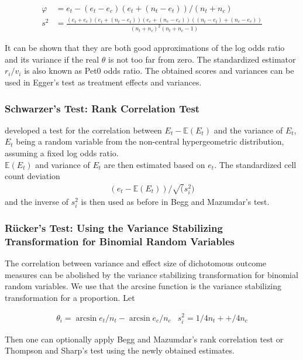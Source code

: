 \documentclass[11pt,a4paper,twoside]{book}\usepackage[]{graphicx}\usepackage[]{color}
\begin{document}
\begin{align}
\varphi &= e_t - (e_t - e_c)(e_t + (n_t - e_t))/(n_t + n_c) \label{harbord.score} \\
s^2 &= \frac{(e_t + e_c)(e_t + (n_t - e_t))(e_c + (n_c - e_c))((n_t - e_t) + (n_c - e_c))}{(n_t + n_c)^2(n_t + n_c - 1)} \label{harbord.variance}
\end{align}

It can be shown that they are both good approximations of the log odds ratio and its variance if the real $\theta$ is not too far from zero. The standardized estimator $r_i/v_i$ is also known as Pet0 odds ratio. The obtained scores and variances can be used in Egger's test as treatment effects and variances.


\subsubsection{Schwarzer's Test: Rank Correlation Test} \label{sec:Schwarzer}
\citet{Schwarzer} developed a test for the correlation between $E_t - \mathbb{E}(E_t)$ and the variance of $E_t$, $E_t$ being a random variable from the non-central hypergeometric distribution, assuming a fixed log odds ratio. \\
$\mathbb{E}(E_t)$ and variance of $E_t$ are then estimated based on $e_t$. The standardized cell count deviation 
\begin{align}
(e_t - \mathbb{E}(E_t))/\sqrt(s_i^2)
\end{align}
and the inverse of $s_i^2$ is then used as before in Begg and Mazumdar's test.

\subsubsection{R\"ucker's Test: Using the Variance Stabilizing Transformation for Binomial Random Variables} \label{sec:Rucker}
The correlation between variance and effect size of dichotomous outcome measures can be abolished by the variance stabilizing transformation for binomial random variables. We use that the arcsine function is the variance stabilizing transformation for a proportion. Let

\begin{align}
\theta_i = \arcsin{e_t/n_t} - \arcsin{e_c/n_c} \nonumber &
s_i^2 = 1/4n_t + +/4n_c \nonumber
\end{align}

Then one can optionally apply Begg and Mazumdar's rank correlation test or Thompson and Sharp's test using the newly obtained estimates.
\end{document}
